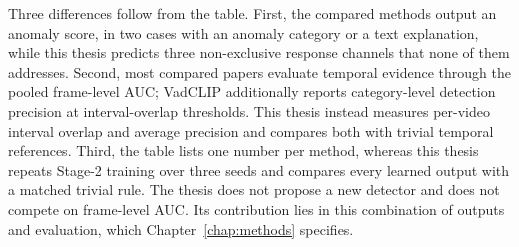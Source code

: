 Three differences follow from the table. First, the compared methods output
an anomaly score, in two cases with an anomaly category or a text explanation,
while this thesis predicts three non-exclusive response channels that none of
them addresses. Second, most compared papers evaluate temporal evidence through
the pooled frame-level AUC; VadCLIP additionally reports category-level
detection precision at interval-overlap thresholds. This thesis instead
measures per-video interval overlap and average precision and compares both
with trivial temporal references. Third, the table lists one number per method,
whereas this thesis repeats Stage-2 training over three seeds and compares every
learned output with a matched trivial rule. The thesis does not propose a new detector and does not compete
on frame-level AUC. Its contribution lies in this combination of outputs and
evaluation, which Chapter~\ref{chap:methods} specifies.

